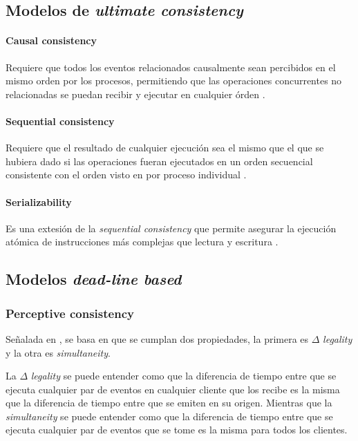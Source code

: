 \subsection{Modelos de \emph{ultimate consistency}}

\paragraph{Causal consistency} Requiere que todos los eventos relacionados causalmente sean percibidos en el mismo orden por los procesos, permitiendo que las operaciones concurrentes no relacionadas se puedan recibir y ejecutar en cualquier órden \cite{lamport1978time}.

\paragraph{Sequential consistency} Requiere que el resultado de cualquier ejecución sea el mismo que el que se hubiera dado si las operaciones fueran ejecutados en un orden secuencial consistente con el orden visto en por proceso individual \cite{lamport1979make}.

\paragraph{Serializability} Es una extesión de la \emph{sequential consistency} que permite asegurar la ejecución atómica de instrucciones más complejas que lectura y escritura \cite{bernstein1987rrency}.

\subsection{Modelos \emph{dead-line based}}

\subsubsection{Perceptive consistency}

Señalada en \cite{bouillot2005fast}, se basa en que se cumplan dos propiedades, la primera es $\Delta$ \emph{legality} y la otra es \emph{simultaneity}.

La $\Delta$ \emph{legality} se puede entender como que la diferencia de tiempo entre que se ejecuta cualquier par de eventos en cualquier cliente que los recibe es la misma que la diferencia de tiempo entre que se emiten en su origen. Mientras que la \emph{simultaneity} se puede entender como que la diferencia de tiempo entre que se ejecuta cualquier par de eventos que se tome es la misma para todos los clientes.

